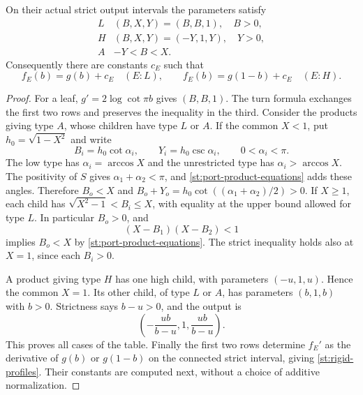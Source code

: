 \begin{proposition}\label{st:port-types}
On their actual strict output intervals the parameters satisfy
\begin{equation}\label{st:parameter-table}
 \begin{array}{c|c}
 L&(B,X,Y)=(B,B,1),\quad B>0,\\
 H&(B,X,Y)=(-Y,1,Y),\quad Y>0,\\
 A&-Y<B<X.
 \end{array}
\end{equation}
Consequently there are constants $c_E$ such that
\begin{equation}\label{st:rigid-profiles}
 f_E(b)=g(b)+c_E\quad(E:L),\qquad
 f_E(b)=g(1-b)+c_E\quad(E:H).
\end{equation}
\end{proposition}
\begin{proof}
For a leaf, $g'=2\log\cot\pi b$ gives $(B,B,1)$.
The turn formula exchanges the first two rows and
preserves the inequality in the third.
Consider the products giving type $A$, whose children
have type $L$ or $A$.
If the common $X<1$, put $h_0=\sqrt{1-X^2}$ and write
\[
 B_i=h_0\cot\alpha_i,\qquad
 Y_i=h_0\csc\alpha_i,\qquad 0<\alpha_i<\pi.
\]
The low type has $\alpha_i=\arccos X$ and the
unrestricted type has $\alpha_i>\arccos X$.
The positivity of $S$ gives $\alpha_1+\alpha_2<\pi$,
and \eqref{st:port-product-equations} adds these angles.
Therefore $B_o<X$ and
$B_o+Y_o=h_0\cot((\alpha_1+\alpha_2)/2)>0$.
If $X\ge1$, each child has
$\sqrt{X^2-1}<B_i\le X$, with equality at the
upper bound allowed for type $L$.
In particular $B_o>0$, and
\[
 (X-B_1)(X-B_2)<1
\]
implies $B_o<X$ by \eqref{st:port-product-equations}.
The strict inequality holds also at $X=1$, since
each $B_i>0$.

A product giving type $H$ has one high child, with
parameters $(-u,1,u)$. Hence the common $X=1$.
Its other child, of type $L$ or $A$, has parameters
$(b,1,b)$ with $b>0$. Strictness says $b-u>0$,
and the output is
\[
 \left(-\frac{ub}{b-u},1,\frac{ub}{b-u}\right).
\]
This proves all cases of the table.
Finally the first two rows determine $f_E'$ as
the derivative of $g(b)$ or $g(1-b)$ on the
connected strict interval, giving \eqref{st:rigid-profiles}.
Their constants are computed next, without a choice
of additive normalization.
\end{proof}

